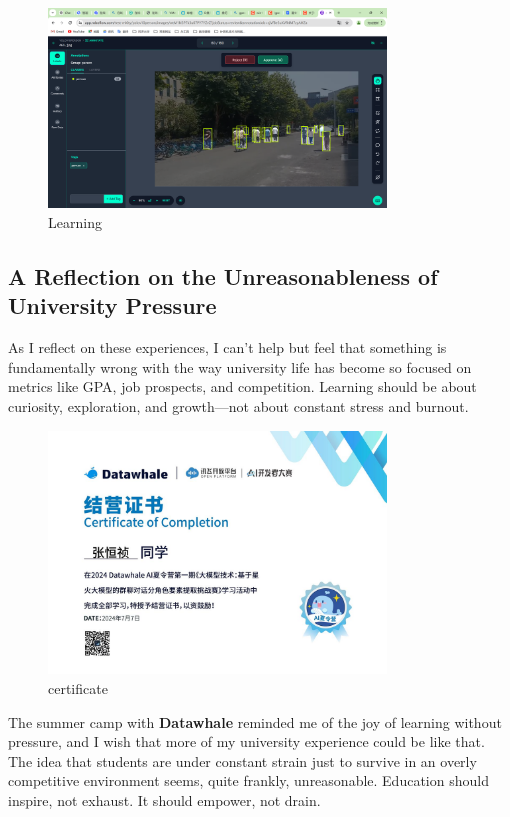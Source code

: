 \documentclass[a4paper]{article} 	%
\begin{document}
\begin{figure}[h!]
	\centering
	\includegraphics[width=0.8\textwidth]{fig010.png}  %
	\caption{Learning}
	\label{fig:010}
\end{figure}

\subsection*{A Reflection on the Unreasonableness of University Pressure}

As I reflect on these experiences, I can’t help but feel that something is fundamentally wrong with the way university life has become so focused on metrics like GPA, job prospects, and competition. Learning should be about curiosity, exploration, and growth—not about constant stress and burnout.

\begin{figure}[h!]
	\centering
	\includegraphics[width=0.8\textwidth]{fig011.jpg}  %
	\caption{certificate}
	\label{fig:011}
\end{figure}

The summer camp with \textbf{Datawhale} reminded me of the joy of learning without pressure, and I wish that more of my university experience could be like that. The idea that students are under constant strain just to survive in an overly competitive environment seems, quite frankly, unreasonable. Education should inspire, not exhaust. It should empower, not drain.
\end{document}
